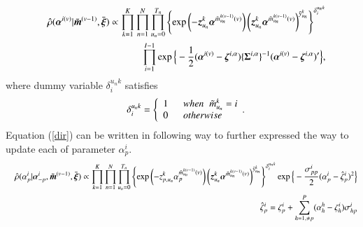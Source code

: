 \documentclass[a4paper,oneside,onecolumn,preprint,10pt,authoryear]{elsarticle}
\begin{document}
\begin{eqnarray}
&& \hat{\rho}(\mbox{\boldmath$\alpha$}^{i(v)}|\tilde{\mbox{\boldmath$m$}}^{(v-1)},\bar{\mbox{\boldmath$\xi$}}) \propto \prod_{k=1}^K \prod_{n=1}^{N} \prod_{u_n=0}^{T_n} 
 \left\{ \exp\left(- \mbox{\boldmath$z$}_{u_n}^k\mbox{\boldmath$\alpha$}^{\tilde{m}_{u_n}^{k(v-1)}(v)} \right)\left(
      \mbox{\boldmath$z$}_{u_n}^k\mbox{\boldmath$\alpha$}^{\tilde{m}_{u_n}^{k(v-1)}(v)}\right)^{\bar{y}_{u_n}^k}\right\}^{\delta_{i}^{u_nk}}
\nonumber \\
&& \prod_{i=1}^{I-1}\exp\Big\{-\frac{1}{2}(\mbox{\boldmath$\alpha$}^{i(v)}
      -\mbox{\boldmath$\zeta$}^{i,\alpha})
      \{\mbox{\boldmath$\Sigma$}^{i,\alpha}\}^{-1}
      (\mbox{\boldmath$\alpha$}^{i(v)}-\mbox{\boldmath$\zeta$}^{i,\alpha})^\prime \Big\}, \label{dir}
\end{eqnarray}
where dummy variable $\delta_{i}^{u_nk}$ satisfies 
\begin{eqnarray}
&& \delta_{i}^{u_nk}=\left\{
\begin{array}{ll}
1 & \hspace{2mm} when \hspace{2mm}\tilde{m}_{u_n}^k=i\\
0 & \hspace{2mm} otherwise
\end{array}.\right.
\end{eqnarray}
Equation (\ref{dir}) can be written in following way to further expressed the way to update each of parameter $\alpha_{p}^i$. 
 \begin{eqnarray}
      && \hat{\rho}(\alpha_{p}^i|\mbox{\boldmath$\alpha$}_{-p}^i,\tilde{\mbox{\boldmath$m$}}^{(v-1)},
      \bar{\mbox{\boldmath$\xi$}}) \propto 
\prod_{k=1}^K \prod_{n=1}^{N} \prod_{u_n=0}^{T_n} 
  \left\{\exp \left(- z_{p,u_n}^k \alpha_p^{\tilde{m}_{u_n}^{k(v-1)}(v)} \right)
\left(\mbox{\boldmath$z$}_{u_n}^k\mbox{\boldmath$\alpha$}^{\tilde{m}_{u_n}^{k(v-1)}(v)}\right)^{\bar{y}_{u_n}^k}\right\}^{\delta_{i}^{u_nk}} 
 \exp\Big\{-\frac{\sigma_{pp}^i}{2}(\alpha_{p}^i-\hat{\zeta}_{p}^i)^2 \Big\} \nonumber \\
&& \hspace{10mm}
      \hat{\zeta}_{p}^i
      = \zeta_{p}^i+\sum_{h=1,\neq p}^{P}(\alpha_{h}^h-\zeta_h^{i})\sigma_{hp}^i
       \label{condition1}
      \end{eqnarray}
\end{document}
